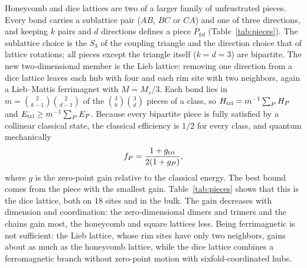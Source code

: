 \documentclass[prb,twocolumn,superscriptaddress,amsmath,amssymb,floatfix]{revtex4-2}
\begin{document}
Honeycomb and dice lattices are two of a larger family of unfrustrated pieces. Every bond carries a sublattice pair ($AB$, $BC$ or $CA$) and one of three directions, and keeping $k$ pairs and $d$ directions defines a piece $P_{kd}$ (Table~\ref{tab:pieces}). The sublattice choice is the $S_3$ of the coupling triangle and the direction choice that of lattice rotations; all pieces except the triangle itself ($k=d=3$) are bipartite. The new two-dimensional member is the Lieb lattice: removing one direction from a dice lattice leaves each hub with four and each rim site with two neighbors, again a Lieb--Mattis ferrimagnet with $M=M_s/3$. Each bond lies in $m=\binom{2}{k-1}\binom{2}{d-1}$ of the $\binom3k\binom3d$ pieces of a class, so $H_{\rm tri}=m^{-1}\sum_PH_P$ and $E_{\rm tri}\ge m^{-1}\sum_PE_P$. Because every bipartite piece is fully satisfied by a collinear classical state, the classical efficiency is $1/2$ for every class, and quantum mechanically
\begin{equation}
f_P=\frac{1+g_{\rm tri}}{2(1+g_P)},
\label{eq:fP}
\end{equation}
where $g$ is the zero-point gain relative to the classical energy. The best bound comes from the piece with the smallest gain. Table~\ref{tab:pieces} shows that this is the dice lattice, both on 18 sites and in the bulk. The gain decreases with dimension and coordination: the zero-dimensional dimers and trimers and the chains gain most, the honeycomb and square lattices less. Being ferrimagnetic is not sufficient: the Lieb lattice, whose rim sites have only two neighbors, gains about as much as the honeycomb lattice, while the dice lattice combines a ferromagnetic branch without zero-point motion with sixfold-coordinated hubs.
\end{document}
